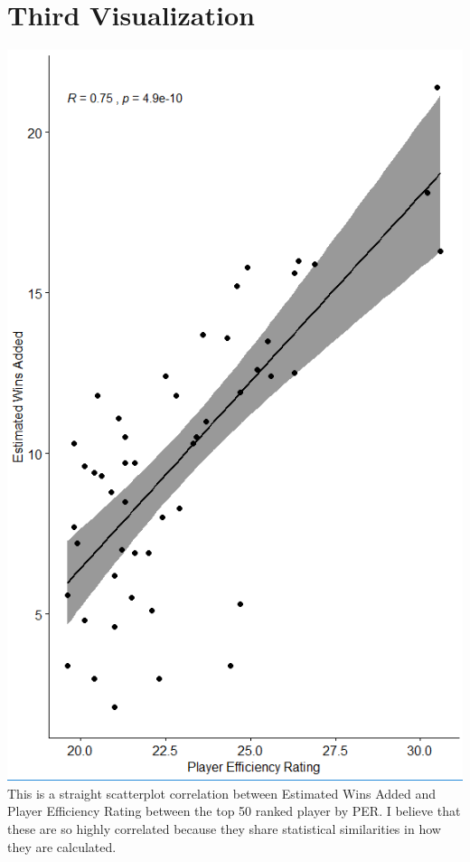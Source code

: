 \documentclass{article}
\begin{document}
\section{Third Visualization}
\includegraphics{PS6c_Cocklin}
\\[12pt]
This is a straight scatterplot correlation between Estimated Wins Added and Player Efficiency Rating between the top 50 ranked player by PER. I believe that these are so highly correlated because they share statistical similarities in how they are calculated. 
\end{document}
